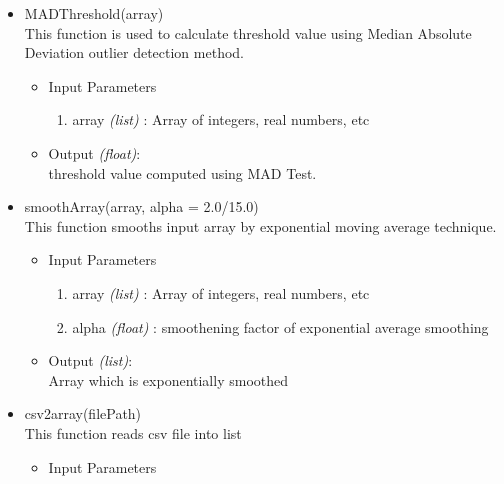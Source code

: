 \begin{itemize}
\begin{itemize}
	\end{itemize}
 
 
 \item MADThreshold(array) \\
 
 This function is used to calculate threshold value using Median Absolute Deviation outlier detection method.
 
 \begin{itemize}
	  \item Input Parameters
	  
	  \begin{enumerate}
	    \item array \textit{(list)} : Array of integers, real numbers, etc
	    \end{enumerate}

	  \item Output \textit{(float)}: \\
	  threshold value computed using MAD Test.
	  
	\end{itemize}
 
 \item smoothArray(array, alpha = 2.0/15.0) \\
 This function smooths input array by exponential moving average technique.
 
 \begin{itemize}
	  \item Input Parameters
	  
	  \begin{enumerate}
	    \item array \textit{(list)} : Array of integers, real numbers, etc
	    \item alpha \textit{(float)} : smoothening factor of exponential average smoothing
	    \end{enumerate}

	  \item Output \textit{(list)}: \\
	  Array which is exponentially smoothed
	  
	\end{itemize}
 
 
 \item csv2array(filePath) \\
 
  This function reads csv file into list
 
 \begin{itemize}
	  \item Input Parameters
	  

\end{itemize}
\end{itemize}
